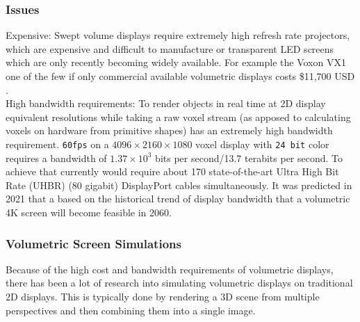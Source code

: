\subsubsection{Issues}

Expensive: Swept volume displays require extremely high refresh rate projectors, which are expensive and difficult to manufacture or transparent LED screens which are only recently becoming widely available. For example the Voxon VX1 one of the few if only commercial available volumetric displays costs \$11,700 USD \cite{noauthor_products_nodate}. \\

High bandwidth requirements: To render objects in real time at 2D display equivalent resolutions while taking a raw voxel stream (as apposed to calculating voxels on hardware from primitive shapes) has an extremely high bandwidth requirement. \texttt{60fps} on a $4096 \times 2160 \times 1080$ voxel display with \texttt{24 bit} color requires a bandwidth of $1.37 \times 10^3$ bits per second/13.7 terabits per second. To achieve that currently would require about 170 state-of-the-art Ultra High Bit Rate (UHBR) (80 gigabit) DisplayPort cables simultaneously. It was predicted in 2021 \cite{LAM2021050011} that a based on the historical trend of display bandwidth that a volumetric 4K screen will become feasible in 2060.

\subsubsection{Volumetric Screen Simulations}
Because of the high cost and bandwidth requirements of volumetric displays, there has been a lot of research into simulating volumetric displays on traditional 2D displays. This is typically done by rendering a 3D scene from multiple perspectives and then combining them into a single image. \cite{10.1145/3290605.3300763}